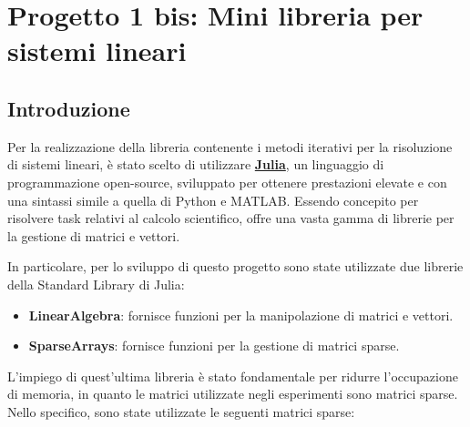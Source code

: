 \chapter{Progetto 1 bis: Mini libreria per sistemi lineari}
\section{Introduzione}\label{sec:intro}
Per la realizzazione della libreria contenente i metodi iterativi per la risoluzione
di sistemi lineari, è stato scelto di utilizzare \href{https://julialang.org/}{\textbf{Julia}},
un linguaggio di programmazione open-source, sviluppato per ottenere prestazioni
elevate e con una sintassi simile a quella di Python e MATLAB. Essendo concepito
per risolvere task relativi al calcolo scientifico, offre una vasta gamma di
librerie per la gestione di matrici e vettori.

In particolare, per lo sviluppo di questo progetto sono state utilizzate due
librerie della Standard Library di Julia:
\begin{itemize}
    \item \textbf{LinearAlgebra}: fornisce funzioni per la manipolazione di
          matrici e vettori.
    \item \textbf{SparseArrays}: fornisce funzioni per la gestione di matrici sparse.
\end{itemize}

L'impiego di quest'ultima libreria è stato fondamentale per ridurre l'occupazione
di memoria, in quanto le matrici utilizzate negli esperimenti sono matrici sparse.
Nello specifico, sono state utilizzate le seguenti matrici sparse:
\begin{table}[!ht]
    \centering
\end{table}

